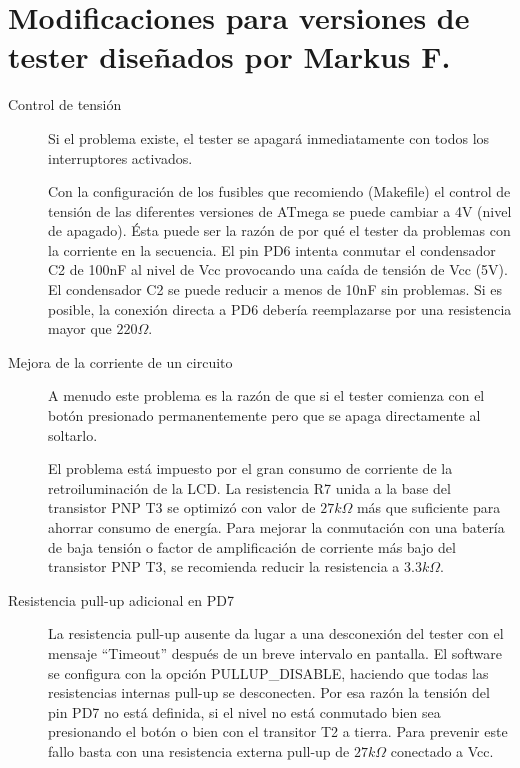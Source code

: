 \section{Modificaciones para versiones de tester diseñados por Markus F.}
\label{sec:change_markus}
\begin{description}

\item[Control de tensión]
Si el problema existe, el tester se apagará inmediatamente con todos los interruptores activados.

Con la configuración  de los fusibles que recomiendo (Makefile)  el control de tensión de las  diferentes versiones de
ATmega se puede  cambiar a 4V (nivel de apagado).  Ésta puede ser la razón  de por qué el tester da  problemas con la
corriente en la secuencia. El pin PD6 intenta conmutar el  condensador C2 de 100nF al nivel de Vcc provocando una caída
de tensión de Vcc (5V). El  condensador C2 se puede reducir a menos de 10nF sin  problemas. Si es posible, la conexión
directa a PD6 debería reemplazarse por una resistencia mayor que \(220\Omega\).

\item[Mejora de la corriente de un circuito]

A menudo este problema  es la razón de que si  el tester comienza con el botón presionado  permanentemente pero que se
apaga directamente al soltarlo.

El problema está impuesto por el gran consumo de corriente de la retroiluminación de la LCD. La resistencia R7 unida a
la base  del transistor PNP  T3 se optimizó  con valor de \(27k  \Omega\) más que  suficiente para ahorrar  consumo de
energía. Para mejorar  la conmutación con una batería de  baja tensión o factor de amplificación  de corriente más
bajo del transistor PNP T3, se recomienda reducir la resistencia a \(3.3k \Omega\).

\item[Resistencia pull-up adicional en PD7]
La resistencia pull-up ausente da lugar a una desconexión del tester con el mensaje ``Timeout'' después de un breve intervalo en pantalla. El software se configura con la opción PULLUP\_DISABLE, haciendo que todas las resistencias internas pull-up se desconecten. Por esa razón la tensión del pin PD7 no está definida, si el nivel no está conmutado bien sea presionando el botón o bien con el transitor T2 a tierra. Para prevenir este fallo basta con una resistencia externa pull-up de \(27k \Omega\) conectado a Vcc.


\end{description}
